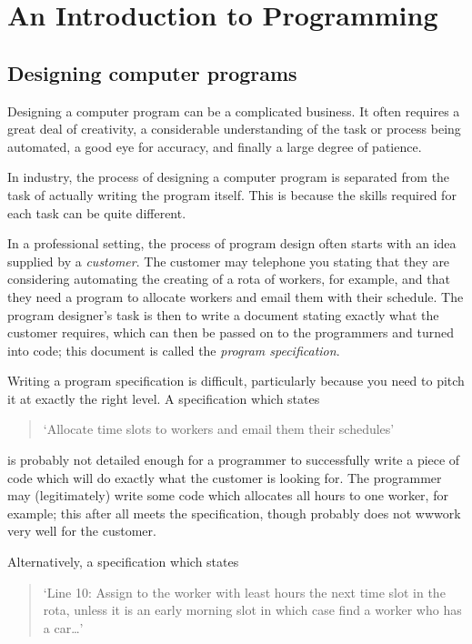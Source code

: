 
\newpage 
\section{An Introduction to Programming}

\subsection{Designing computer programs}

Designing a computer program can be a complicated business. It often
requires a  great deal of creativity, a considerable understanding of
the task or process being automated, a good eye for accuracy, and
finally a large degree of patience. 

In industry, the process of designing a computer program is separated from
the task of actually writing the program itself. This is because the skills
required for each task can be quite different. 

In a professional setting, the process of program design often starts
with an idea supplied by a  
{\em customer}. The customer may telephone you
stating that they are  
considering automating the creating of a rota of workers, for example,
and that they need a program to allocate workers and email them with
their schedule. The program designer's task is then to write 
a document stating exactly what the 
customer requires, which can then be passed on to the programmers
and turned into code; this document is called the {\em program specification}. 

Writing a program specification is difficult, particularly because you 
need to pitch it at exactly the right level. A specification which states 

\begin{quote}
`Allocate time slots to workers and email them their schedules'
\end{quote}

is probably not detailed enough for a programmer to successfully write a 
piece of code which will do exactly what the customer is looking for. The
programmer may (legitimately) write some code which allocates all
hours to one worker, for example; this after all meets the
specification, though probably does not wwwork very well for the customer.

Alternatively, a specification which states

\begin{quote}
`Line 10: Assign to the worker with least hours the next time slot in
the rota, unless it is an early morning slot in which case find a
worker who has a car\ldots'
\end{quote}

